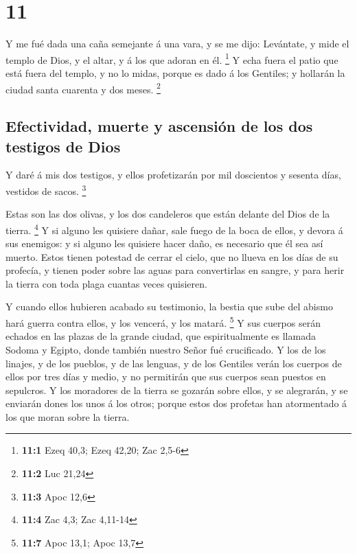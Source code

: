 \hypertarget{section-10}{%
\section{11}\label{section-10}}

 Y me fué dada una caña semejante á una vara, y se me
dijo: Levántate, y mide el templo de Dios, y el altar, y á los que
adoran en él. \footnote{\textbf{11:1} Ezeq 40,3; Ezeq 42,20; Zac 2,5-6}
 Y echa fuera el patio que está fuera del templo, y no lo
midas, porque es dado á los Gentiles; y hollarán la ciudad santa
cuarenta y dos meses. \footnote{\textbf{11:2} Luc 21,24}

\hypertarget{efectividad-muerte-y-ascensiuxf3n-de-los-dos-testigos-de-dios}{%
\subsection{Efectividad, muerte y ascensión de los dos testigos de
Dios}\label{efectividad-muerte-y-ascensiuxf3n-de-los-dos-testigos-de-dios}}

 Y daré á mis dos testigos, y ellos profetizarán por mil
doscientos y sesenta días, vestidos de sacos. \footnote{\textbf{11:3}
  Apoc 12,6}

 Estas son las dos olivas, y los dos candeleros que están
delante del Dios de la tierra. \footnote{\textbf{11:4} Zac 4,3; Zac
  4,11-14}  Y si alguno les quisiere dañar, sale fuego de
la boca de ellos, y devora á sus enemigos: y si alguno les quisiere
hacer daño, es necesario que él sea así muerto.  Estos
tienen potestad de cerrar el cielo, que no llueva en los días de su
profecía, y tienen poder sobre las aguas para convertirlas en sangre, y
para herir la tierra con toda plaga cuantas veces quisieren.

 Y cuando ellos hubieren acabado su testimonio, la bestia
que sube del abismo hará guerra contra ellos, y los vencerá, y los
matará. \footnote{\textbf{11:7} Apoc 13,1; Apoc 13,7}  Y
sus cuerpos serán echados en las plazas de la grande ciudad, que
espiritualmente es llamada Sodoma y Egipto, donde también nuestro Señor
fué crucificado.  Y los de los linajes, y de los pueblos,
y de las lenguas, y de los Gentiles verán los cuerpos de ellos por tres
días y medio, y no permitirán que sus cuerpos sean puestos en sepulcros.
 Y los moradores de la tierra se gozarán sobre ellos, y
se alegrarán, y se enviarán dones los unos á los otros; porque estos dos
profetas han atormentado á los que moran sobre la tierra.

